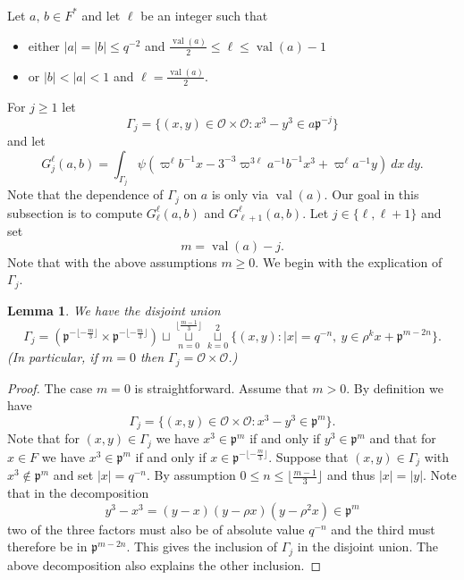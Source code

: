 \documentclass[12pt]{amsart}
\newcommand{\abs}[1]{\left|{#1}\right|}
\newcommand{\p}{\mathfrak{p}}
\renewcommand{\O}{\mathcal{O}}
\newcommand{\val}{{\operatorname{val}}}
\newtheorem{lemma}[theorem]{Lemma}
\theoremstyle{remark}
\begin{document}
\subsubsection{}\label{ss G int} Let $a,\,b\in F^*$ and let $\ell$  be an integer such that
\begin{itemize}
\item either $\abs{a}=\abs{b}\le q^{-2}$ and $\frac{\val(a)}2\le \ell\le \val(a)-1$ 
\item or $\abs{b}<\abs{a}<1$ and $\ell=\frac{\val(a)}2$.
\end{itemize}
For $j\ge 1$ let 
\[
\Gamma_j=\{(x,y)\in\O\times \O: x^3-y^3 \in a\p^{-j}\}
\]
and let
\[
G_j^\ell(a,b)=\int_{\Gamma_j}\psi(\varpi^\ell b^{-1}x-3^{-3}\varpi^{3\ell} a^{-1}b^{-1}x^3+\varpi^\ell a^{-1} y)\ dx\ dy.
\]
Note that the dependence of $\Gamma_j$ on $a$ is only via $\val(a)$. 
Our goal in this subsection is to compute $G_\ell^\ell(a,b)$ and $G_{\ell+1}^\ell(a,b)$. Let $j\in\{\ell,\ell+1\}$ and set
\[
m=\val(a)-j. 
\]
Note that with the above assumptions $m\ge 0$. We begin with the explication of $\Gamma_j$.
\begin{lemma}\label{lem gamma}
We have the disjoint union
\[
\Gamma_j=\left(\p^{-\lfloor -\frac{m}3\rfloor} \times \p^{-\lfloor -\frac m3\rfloor}\right)\sqcup \mathop{\sqcup}\limits_{n=0}^{\lfloor\frac{m-1}3\rfloor} \mathop{\sqcup}\limits_{k=0}^2 \{(x,y):\abs{x}=q^{-n},\ y\in \rho^k x+\p^{m-2n}\}.
\]
(In particular, if $m=0$ then $\Gamma_j=\O\times \O$.)
\end{lemma}
\begin{proof}
The case $m=0$ is straightforward. Assume that $m>0$. By definition we have
\[
\Gamma_j=\{(x,y)\in\O\times \O: x^3-y^3\in\p^m\}.
\]
Note that for $(x,y)\in \Gamma_j$ we have $x^3\in \p^m$ if and only if $y^3\in \p^m$ and that for $x\in F$ we have $x^3\in \p^m$ if and only if $x\in \p^{-\lfloor -\frac{m}3\rfloor}$. Suppose that $(x,y)\in \Gamma_j$ with $x^3\not\in \p^m$ and set $\abs{x}=q^{-n}$. By assumption $0\le n\le  \lfloor\frac{m-1}3\rfloor$ and thus $\abs{x}=\abs{y}$. Note that in the decomposition
\[
y^3-x^3=(y-x)(y-\rho x)(y-\rho^2 x)\in \p^m
\]
two of the three factors must also be of absolute value $q^{-n}$ and the third must therefore be in $\p^{m-2n}$. This gives the inclusion of $\Gamma_j$ in the disjoint union. The above decomposition also explains the other inclusion. 
\end{proof}
\end{document}
